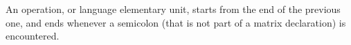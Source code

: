 An operation, or language elementary unit, starts from the end of the previous one, and ends whenever a semicolon (that is not part of a matrix declaration) is encountered.
